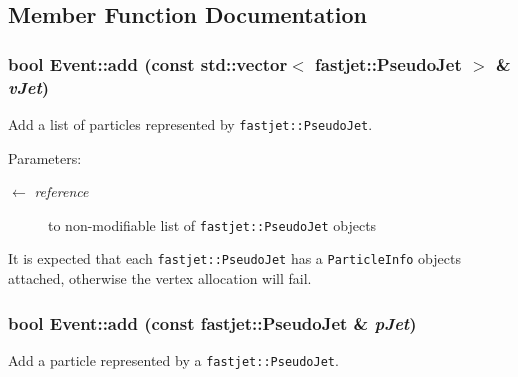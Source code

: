 \subsection{Member Function Documentation}
\hypertarget{classEvent_4e9ebea3ebf37625b7dfc89c4839354a}{
\subsubsection[add]{\setlength{\rightskip}{0pt plus 5cm}bool Event::add (const std::vector$<$ fastjet::Pseudo\-Jet $>$ \& {\em v\-Jet})}}
\label{classEvent_4e9ebea3ebf37625b7dfc89c4839354a}


Add a list of particles represented by {\tt fastjet::Pseudo\-Jet}. 

\begin{Desc}
\item[Parameters:]
\begin{description}
\item[\mbox{$\leftarrow$} {\em reference}]to non-modifiable list of {\tt fastjet::Pseudo\-Jet} objects\end{description}
\end{Desc}
It is expected that each {\tt fastjet::Pseudo\-Jet} has a {\tt Particle\-Info} objects attached, otherwise the vertex allocation will fail. \hypertarget{classEvent_f14e917b52b542b5d3bcbc62524d3eda}{
\subsubsection[add]{\setlength{\rightskip}{0pt plus 5cm}bool Event::add (const fastjet::Pseudo\-Jet \& {\em p\-Jet})}}
\label{classEvent_f14e917b52b542b5d3bcbc62524d3eda}


Add a particle represented by a {\tt fastjet::Pseudo\-Jet}. 


